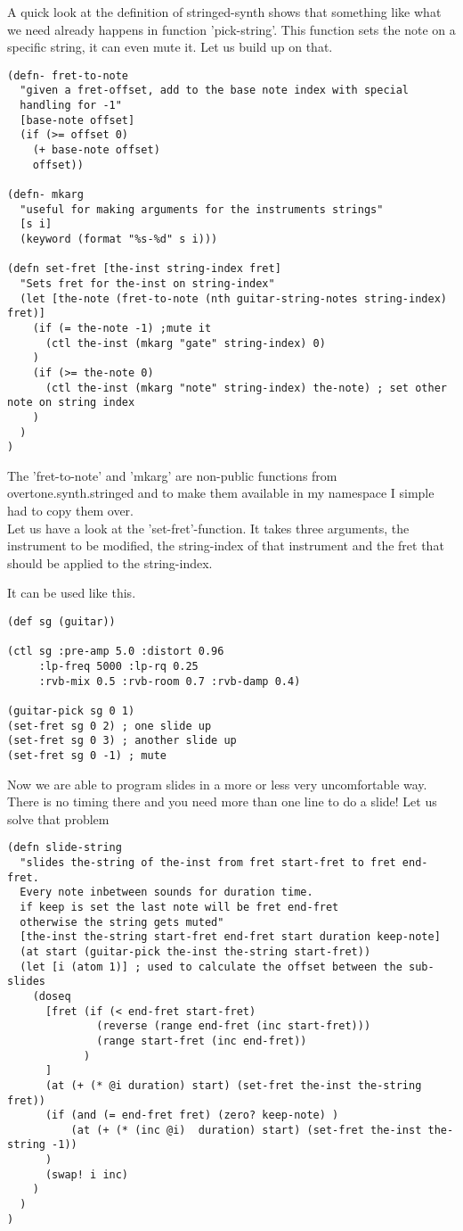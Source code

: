 A quick look at the definition of stringed-synth shows that something like what we need already happens in function 'pick-string'. This function sets the note on a specific string, it can even mute it. Let us build up on that.

\begin{lstlisting}
(defn- fret-to-note
  "given a fret-offset, add to the base note index with special
  handling for -1"
  [base-note offset]
  (if (>= offset 0)
    (+ base-note offset)
    offset))

(defn- mkarg
  "useful for making arguments for the instruments strings"
  [s i]
  (keyword (format "%s-%d" s i)))

(defn set-fret [the-inst string-index fret]
  "Sets fret for the-inst on string-index"
  (let [the-note (fret-to-note (nth guitar-string-notes string-index) fret)]
    (if (= the-note -1) ;mute it
      (ctl the-inst (mkarg "gate" string-index) 0)
    )
    (if (>= the-note 0)
      (ctl the-inst (mkarg "note" string-index) the-note) ; set other note on string index
    )
  )
)
\end{lstlisting}
The 'fret-to-note' and 'mkarg' are non-public functions from overtone.synth.stringed and to make them available in my namespace I simple had to copy them over.\\
Let us have a look at the 'set-fret'-function. It takes three arguments, the instrument to be modified, the string-index of that instrument and the fret that should be applied to the string-index.

It can be used like this.

\begin{lstlisting}
(def sg (guitar))

(ctl sg :pre-amp 5.0 :distort 0.96
     :lp-freq 5000 :lp-rq 0.25
     :rvb-mix 0.5 :rvb-room 0.7 :rvb-damp 0.4)

(guitar-pick sg 0 1)
(set-fret sg 0 2) ; one slide up
(set-fret sg 0 3) ; another slide up
(set-fret sg 0 -1) ; mute
\end{lstlisting}

Now we are able to program slides in a more or less very uncomfortable way. There is no timing there and you need more than one line to do a slide!
Let us solve that problem

\begin{lstlisting}
(defn slide-string
  "slides the-string of the-inst from fret start-fret to fret end-fret.
  Every note inbetween sounds for duration time.
  if keep is set the last note will be fret end-fret
  otherwise the string gets muted"
  [the-inst the-string start-fret end-fret start duration keep-note]
  (at start (guitar-pick the-inst the-string start-fret))
  (let [i (atom 1)] ; used to calculate the offset between the sub-slides
    (doseq 
      [fret (if (< end-fret start-fret) 
              (reverse (range end-fret (inc start-fret)))
              (range start-fret (inc end-fret))
            )
      ]
      (at (+ (* @i duration) start) (set-fret the-inst the-string fret))
      (if (and (= end-fret fret) (zero? keep-note) ) 
          (at (+ (* (inc @i)  duration) start) (set-fret the-inst the-string -1))
      )
      (swap! i inc)
    )
  )
)
\end{lstlisting}

